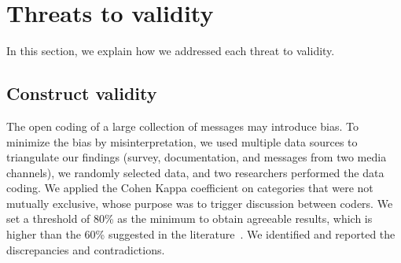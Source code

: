 \section{Threats to validity}
\label{cha:threats}


%

In this section, we explain how we addressed each threat to
validity.

\subsection{Construct validity}

The open coding of a large collection of messages may introduce bias.
To minimize the bias by misinterpretation, we used multiple data sources to triangulate our findings (survey, documentation, and messages from two media channels), we randomly selected data, and two researchers performed the data coding.
We applied the Cohen Kappa coefficient on categories that were not mutually exclusive, whose purpose  was to trigger discussion between coders.
We set a threshold of 80\% as the minimum to obtain agreeable results, which is higher than the 60\% suggested in the literature~\cite{Landis1977}.
We identified and reported the discrepancies and contradictions.

